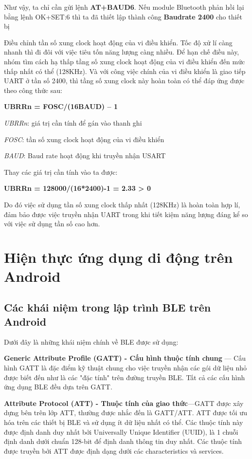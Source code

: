 Như vậy, ta chỉ cần gửi lệnh \textbf{AT+BAUD6}. Nếu module Bluetooth phản hồi lại bằng lệnh OK+SET:6 thì ta đã thiết lập thành công \textbf{Baudrate 2400} cho thiết bị

Điều chỉnh tần số xung clock hoạt động của vi điều khiển.
Tốc độ xử lí càng nhanh thì đi đôi với việc tiêu tốn năng lượng càng nhiều. Để hạn chế điều này, nhóm tìm cách hạ thấp tầng số xung clock hoạt động của vi điều khiển đến mức thấp nhất có thể (128KHz). Và với công việc chính của vi điều khiển là giao tiếp UART ở tần số 2400, thì tầng số xung clock này hoàn toàn có thể đáp ứng được theo công thức sau: 

\textbf{UBRRn = FOSC/(16BAUD) – 1}

\textit{UBRRn}: giá trị cần tính để gán vào thanh ghi

\textit{FOSC}: tần số xung clock hoạt động của vi điều khiển

\textit{BAUD}: Baud rate hoạt động khi truyền nhận USART

Thay các giá trị cần tính vào ta được:

\textbf{UBRRn = 128000/(16*2400)-1 = 2.33 > 0}

Do đó việc sử dụng tần số xung clock thấp nhất (128KHz) là hoàn toàn hợp lí, đảm bảo được việc truyền nhận UART trong khi tiết kiệm năng lượng đáng kể so với việc sử dụng tần số cao hơn.
\section{Hiện thực ứng dụng di động trên Android}

\subsection{Các khái niệm trong lập trình BLE trên Android}
\label{sec: bleterm}
Dưới đây là những khái niệm chính về BLE được sử dụng: \cite{deva}

\textbf{Generic Attribute Profile (GATT) -  Cấu hình thuộc tính chung }— Cấu hình GATT là đặc điểm kỹ thuật chung cho việc truyền nhận các gói dữ liệu nhỏ được biết đến như là các "đặc tính" trên đường truyền BLE. Tất cả các cấu hình ứng dụng BLE đều dựa trên GATT.

\textbf{Attribute Protocol (ATT) - Thuộc tính của giao thức}—GATT được xây dựng bên trên lớp ATT, thường được nhắc đến là GATT/ATT. ATT được tối ưu hóa trên các thiết bị BLE và sử dụng ít dữ liệu nhất có thể. Các thuộc tính này được định danh duy nhất bởi Universally Unique Identifier (UUID), là 1 chuỗi định danh dưới chuẩn 128-bit để định danh thông tin duy nhất. Các thuộc tính được truyền bởi ATT được định dạng dưới các characteristics và services.

